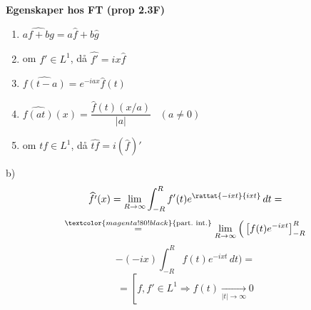 \begin{minipage}[t]{0.45\linewidth}
\textbf{Egenskaper hos FT (prop 2.3F)}
\begin{enumerate}[label=\textcircled{\alph*}]
  \item $\widehat{af + bg} = a\hat{f} + b\hat{g}$
  \item om $f' \in L^1$, då $\widehat{f'} = ix\hat{f}$
  \item $\widehat{f(t - a)} = e^{-iax}\hat{f}(t)$
  \item $\widehat{f(at)}(x) = \dfrac{\hat{f}(t)(x/a)}{|a|}$ \ $(a \neq 0)$
  \item om $tf \in L^1$, då $\widehat{tf} = i(\hat{f})'$
\end{enumerate}
\end{minipage}\hfill\vrule\hfill
\begin{minipage}[t]{0.5\linewidth}
\textcolor{red!70!black}{} b)
\[ \widehat{f'}(x) = \lim_{R \to \infty} \int_{-R}^R f'(t)e^{\rattat{-ixt}{ixt}}\,dt = \]
\[ \overset{\textcolor{magenta!80!black}{\text{part.\ int.}}}{=} \lim_{R \to \infty}\Big( \left[ f(t)e^{-ixt} \right]_{-R}^R \]
\[ - (-ix)\int_{-R}^R f(t)e^{-ixt}\,dt \Big) = \]
\[ = \left[ f, f' \in L^1 \Rightarrow f(t) \xrightarrow[|t| \to \infty]{} 0 \right. \]
\end{minipage}
